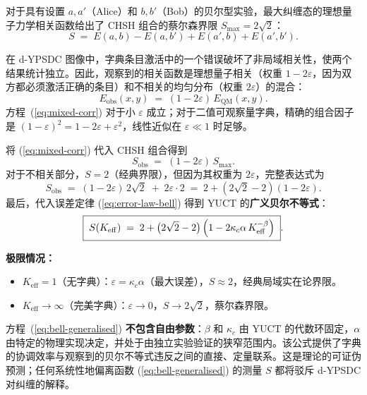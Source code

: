 \documentclass[12pt,a4paper]{article}
\theoremstyle{remark}
\begin{document}
	对于具有设置 $a,a'$（Alice）和 $b,b'$（Bob）的贝尔型实验，最大纠缠态的理想量子力学相关函数给出了 CHSH 组合的蔡尔森界限 $S_{\max}=2\sqrt{2}$：
	\[
	S \;=\; E(a,b)-E(a,b')+E(a',b)+E(a',b').
	\]
	
	在 d-YPSDC 图像中，字典条目激活中的一个错误破坏了非局域相关性，使两个结果统计独立。因此，观察到的相关函数是理想量子相关（权重 $1-2\varepsilon$，因为双方都必须激活正确的条目）和不相关的均匀分布（权重 $2\varepsilon$）的混合：
	\begin{equation}
		E_{\mathrm{obs}}(x,y) \;=\; (1-2\varepsilon)\,E_{\mathrm{QM}}(x,y).
		\label{eq:mixed-corr}
	\end{equation}
	方程~(\ref{eq:mixed-corr}) 对于小 $\varepsilon$ 成立；对于二值可观察量字典，精确的组合因子是 $(1-\varepsilon)^2 = 1-2\varepsilon + \varepsilon^2$，线性近似在 $\varepsilon\ll1$ 时足够。
	
	将 (\ref{eq:mixed-corr}) 代入 CHSH 组合得到
	\[
	S_{\mathrm{obs}} \;=\; (1-2\varepsilon)\,S_{\max}.
	\]
	对于不相关部分，$S=2$（经典界限），但因为其权重为 $2\varepsilon$，完整表达式为
	\begin{equation}
		S_{\mathrm{obs}} \;=\; (1-2\varepsilon)\,2\sqrt{2} \;+\; 2\varepsilon\cdot 2
		\;=\; 2 + (2\sqrt{2}-2)(1-2\varepsilon).
		\label{eq:Sobs-intermediate}
	\end{equation}
	最后，代入误差定律 (\ref{eq:error-law-bell}) 得到 YUCT 的\textbf{广义贝尔不等式}：
	\begin{equation}
		\boxed{\;
			S(K_{\mathrm{eff}}) \;=\; 2 + \bigl(2\sqrt{2}-2\bigr)\,
			\Bigl(1 - 2\kappa_c\alpha\,K_{\mathrm{eff}}^{-\beta}\Bigr)
			\;}.
		\label{eq:bell-generalised}
	\end{equation}
	
	\noindent
	\textbf{极限情况：}
	\begin{itemize}
		\item $K_{\mathrm{eff}}=1$（无字典）：$\varepsilon = \kappa_c\alpha$（最大误差），$S \approx 2$，经典局域实在论界限。
		\item $K_{\mathrm{eff}}\to\infty$（完美字典）：$\varepsilon\to0$，$S\to 2\sqrt{2}$，蔡尔森界限。
	\end{itemize}
	
	方程~(\ref{eq:bell-generalised}) \textbf{不包含自由参数}：$\beta$ 和 $\kappa_c$ 由 YUCT 的代数环固定，$\alpha$ 由特定的物理实现决定，并处于由独立实验验证的狭窄范围内。该公式提供了字典的协调效率与观察到的贝尔不等式违反之间的直接、定量联系。这是理论的可证伪预测；任何系统性地偏离函数 (\ref{eq:bell-generalised}) 的测量 $S$ 都将驳斥 d-YPSDC 对纠缠的解释。
	
\end{document}
